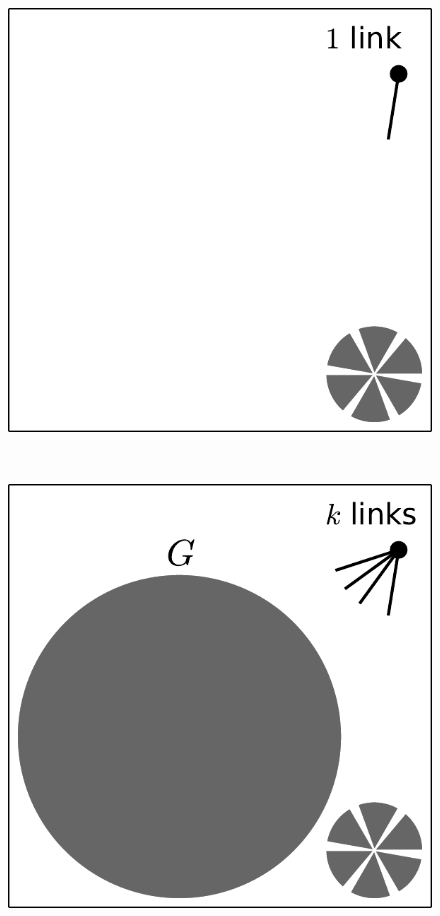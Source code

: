 \documentclass[aps, pre, onecolumn, a4paper, floatfix]{revtex4}
\begin{document}
\begin{figure}[htb]
\begin{minipage}[b]{0.18\linewidth}
\begin{center}
      \includegraphics[width=0.99\columnwidth]{sets_gc_no1.pdf}
    \end{center}
  \end{minipage}
  \begin{minipage}[b]{0.05\linewidth}
  \ 
  \end{minipage}
  \begin{minipage}[b]{0.18\linewidth}
    \begin{center}
      \includegraphics[width=0.99\columnwidth]{sets_gc_allk.pdf}

\end{center}
\end{minipage}
\end{figure}
\end{document}
